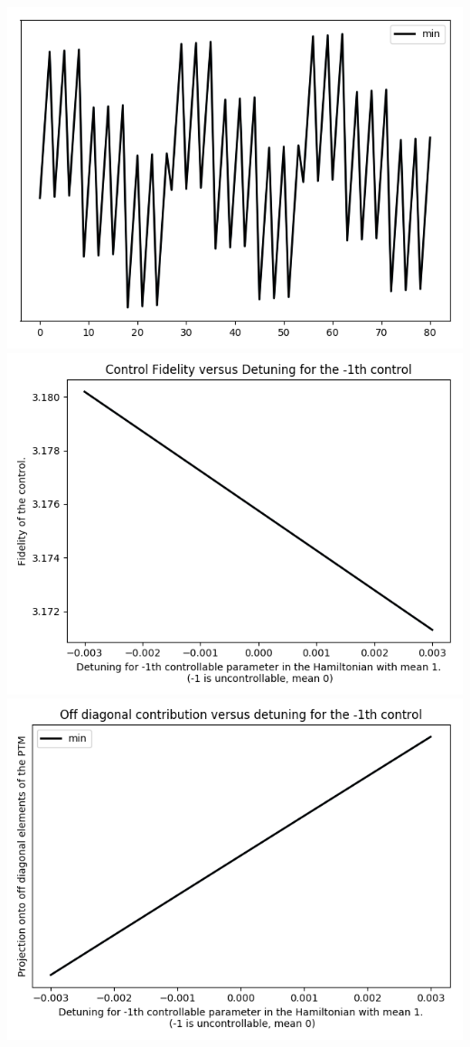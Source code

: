\documentclass{article}
\begin{document}
\begin{center}
\includegraphics[scale=.9]{report_pickled_controls16/control_dpn_all}
\includegraphics[scale=.9]{control_fid_0}
\includegraphics[scale=.9]{off_diag_0}

\end{center}
\end{document}
